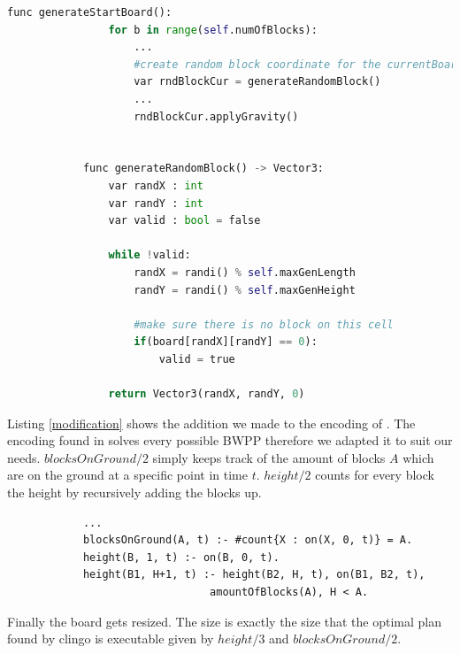 \documentclass[runningheads]{llncs}
\begin{document}
        \begin{lstlisting}[caption=Generating configuration, label=generatingConfiguration, language=python]
            func generateStartBoard():   
                for b in range(self.numOfBlocks):
                    ... 
                    #create random block coordinate for the currentBoard
                    var rndBlockCur = generateRandomBlock() 
                    ...
                    rndBlockCur.applyGravity()


            func generateRandomBlock() -> Vector3:
                var randX : int
                var randY : int
                var valid : bool = false

                while !valid:
                    randX = randi() % self.maxGenLength
                    randY = randi() % self.maxGenHeight
                    
                    #make sure there is no block on this cell
                    if(board[randX][randY] == 0):
                        valid = true

                return Vector3(randX, randY, 0)
        \end{lstlisting}
            
        Listing \ref{modification} shows the addition we made to the encoding of \cite{originalEncodingPaper}.
        The encoding found in \cite{originalEncodingPaper} solves every possible BWPP therefore we adapted it to suit our needs.\newline
        $blocksOnGround/2$ simply keeps track of the amount of blocks $A$ which are on the ground at a specific point in time $t$.
        $height/2$ counts for every block the height by recursively adding the blocks up.

        \begin{lstlisting}[caption=Addition to the encoding, label=modification]
            %DEFINE
            ...
            blocksOnGround(A, t) :- #count{X : on(X, 0, t)} = A.
            height(B, 1, t) :- on(B, 0, t).
            height(B1, H+1, t) :- height(B2, H, t), on(B1, B2, t),
                                amountOfBlocks(A), H < A.
        \end{lstlisting}
        
        Finally the board gets resized.
        The size is exactly the size that the optimal plan found by clingo is executable given by $height/3$ and $blocksOnGround/2$.
\end{document}
